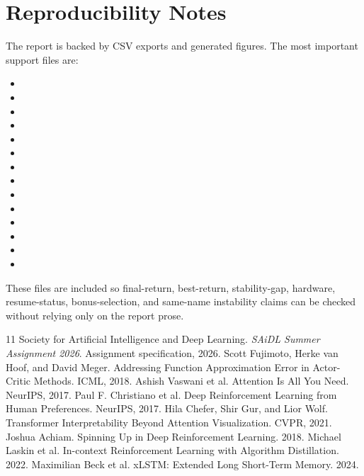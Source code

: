 \documentclass[11pt]{article}
\begin{document}
\section{Reproducibility Notes}
The report is backed by CSV exports and generated figures. The most important support files are:
\begin{itemize}
\item {}
\item {}
\item {}
\item {}
\item {}
\item {}
\item {}
\item {}
\item {}
\item {}
\item {}
\item {}
\item {}
\item {}
\end{itemize}
These files are included so final-return, best-return, stability-gap, hardware, resume-status, bonus-selection, and same-name instability claims can be checked without relying only on the report prose.

\begin{thebibliography}{11}
 Society for Artificial Intelligence and Deep Learning. \emph{SAiDL Summer Assignment 2026}. Assignment specification, 2026.
 Scott Fujimoto, Herke van Hoof, and David Meger. Addressing Function Approximation Error in Actor-Critic Methods. ICML, 2018.
 Ashish Vaswani et al. Attention Is All You Need. NeurIPS, 2017.
 Paul F. Christiano et al. Deep Reinforcement Learning from Human Preferences. NeurIPS, 2017.
 Hila Chefer, Shir Gur, and Lior Wolf. Transformer Interpretability Beyond Attention Visualization. CVPR, 2021.
 Joshua Achiam. Spinning Up in Deep Reinforcement Learning. 2018.
 Michael Laskin et al. In-context Reinforcement Learning with Algorithm Distillation. 2022.
 Maximilian Beck et al. xLSTM: Extended Long Short-Term Memory. 2024.
\end{thebibliography}
\end{document}
